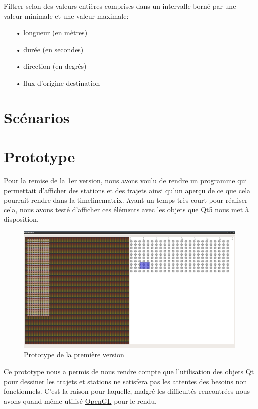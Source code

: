 \documentclass[12pt]{article}
\begin{document}
		Filtrer selon des valeurs entières comprises dans un intervalle borné par une
		valeur minimale et une valeur maximale:
		\begin{itemize}
			\item[•]longueur (en mètres)
			\item[•]durée (en secondes)
			\item[•]direction (en degrés)
			\item[•]flux d’origine-destination
		\end{itemize}
	
	\newpage
	\section{Scénarios}
	
	\newpage
	\section{Prototype}
	Pour la remise de la 1er version, nous avons voulu de rendre un programme qui permettait
	d'afficher des stations et des trajets ainsi qu'un aperçu de ce que cela pourrait rendre
	dans la timelinematrix. Ayant un temps très court pour réaliser cela, nous avons testé
	d'afficher ces éléments avec les objets que \href{https://www.qt.io/}{Qt5}
	nous met à disposition.\\
	

	\begin{figure}[!h]
	\begin{center}
	\includegraphics[scale=0.2]{prototype1_screen_shot.png}
	\caption{Prototype de la première version}
	\end{center}
	\end{figure}		
	
	Ce prototype nous a permis de nous rendre compte que l’utilisation des objets
	\href{https://www.qt.io/}{Qt} pour dessiner les trajets et stations
	ne satisfera pas les attentes des besoins non fonctionnels. C’est la raison pour
	laquelle, malgré les difficultés rencontrées nous avons quand même utilisé
	\href{https://www.khronos.org/registry/OpenGL-Refpages/gl4/}{OpenGL}
	pour le rendu.\\
	
\end{document}
